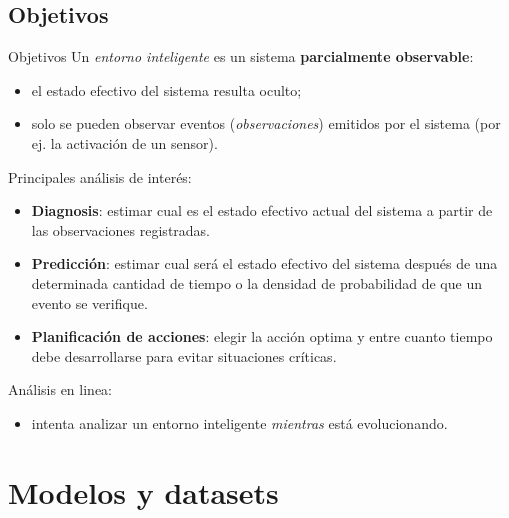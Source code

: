 \documentclass[9pt, handout]{beamer}
\begin{document}
    \subsection{Objetivos}
      \begin{frame}{Objetivos}
        \pause
        Un \textit{entorno inteligente} es un sistema \textbf{parcialmente observable}:
        \pause
        \begin{itemize}
          \item el estado efectivo del sistema resulta oculto;
          \pause
          \item solo se pueden observar eventos (\textit{observaciones}) emitidos por el sistema (por ej. la activación de un sensor).
        \end{itemize}
        
        \vspace{1em}
        \pause
        Principales análisis de interés:
        \pause
        \begin{itemize}
          \item \textbf{Diagnosis}: estimar cual es el estado efectivo actual del sistema a partir de las observaciones registradas.
          \pause
          \item \textbf{Predicción}: estimar cual será el estado efectivo del sistema después de una determinada cantidad de tiempo o la densidad de probabilidad de que un evento se verifique.
          \pause
          \item \textbf{Planificación de acciones}: elegir la acción optima y entre cuanto tiempo debe desarrollarse para evitar situaciones críticas.
        \end{itemize}
        
        \vspace{1em}
        \pause
        Análisis en linea:
        \pause
        \begin{itemize}
          \item intenta analizar un entorno inteligente \textit{mientras} está evolucionando.
        \end{itemize}
      \end{frame}
    
  \section{Modelos y datasets}
\end{document}
